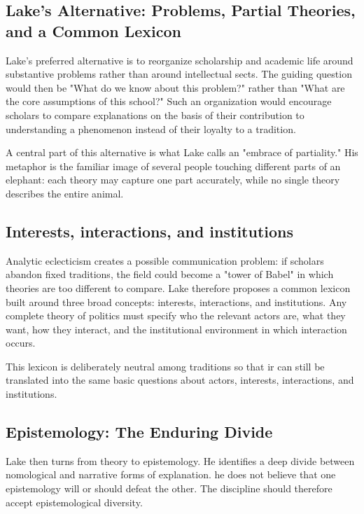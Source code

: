 \subsection{Lake's Alternative: Problems, Partial Theories, and a Common
Lexicon}

Lake's preferred alternative is to reorganize scholarship and academic life around
substantive problems rather than around intellectual sects.  The guiding question would then be "What do we know about
this problem?" rather than "What are the core assumptions of this
school?" Such an organization would encourage scholars to compare
explanations on the basis of their contribution to understanding a
phenomenon instead of their loyalty to a tradition.

A central part of this alternative is what Lake calls an "embrace of
partiality."
His metaphor is the familiar image of several people touching different
parts of an elephant: each theory may capture one part accurately, while
no single theory describes the entire animal.

\subsection{Interests, interactions, and institutions}

Analytic eclecticism creates a possible communication problem: if
scholars abandon fixed traditions, the field could become a "tower of
Babel" in which theories are too different to compare. Lake therefore
proposes a common lexicon built around three broad concepts: interests,
interactions, and institutions. Any complete theory of politics must
specify who the relevant actors are, what they want, how they interact,
and the institutional environment in which interaction occurs.

This lexicon is deliberately neutral among traditions so that ir can still
be translated into the same basic questions about actors, interests,
interactions, and institutions.

\subsection{Epistemology: The Enduring
Divide}

Lake then turns from theory to epistemology. He identifies a deep divide
between nomological and narrative forms of explanation. he does not believe that one epistemology will or
should defeat the other. The discipline should therefore accept epistemological diversity.

